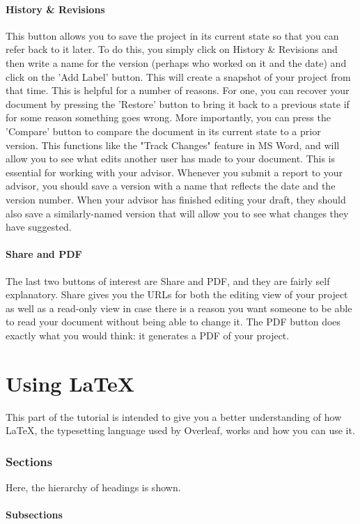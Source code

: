 \documentclass[english,12pt]{article}
\begin{document}
\subsection*{History \& Revisions}
This button allows you to save the project in its current state so that you can refer back to it later. To do this, you simply click on History \& Revisions and then write a name for the version (perhaps who worked on it and the date) and click on the 'Add Label' button. This will create a snapshot of your project from that time. This is helpful for a number of reasons. For one, you can recover your document by pressing the 'Restore' button to bring it back to a previous state if for some reason something goes wrong. More importantly, you can press the 'Compare' button to compare the document in its current state to a prior version. This functions like the "Track Changes" feature in MS Word, and will allow you to see what edits another user has made to your document. This is essential for working with your advisor. Whenever you submit a report to your advisor, you should save a version with a name that reflects the date and the version number. When your advisor has finished editing your draft, they should also save a similarly-named version that will allow you to see what changes they have suggested.

\subsection*{Share and PDF}
The last two buttons of interest are Share and PDF, and they are fairly self explanatory. Share gives you the URLs for both the editing view of your project as well as a read-only view in case there is a reason you want someone to be able to read your document without being able to change it. The PDF button does exactly what you would think: it generates a PDF of your project.

\part*{Using \LaTeX}
This part of the tutorial is intended to give you a better understanding of how \LaTeX, the typesetting language used by Overleaf, works and how you can use it.

\section{Sections}
Here, the hierarchy of headings is shown.
\subsection{Subsections}
\end{document}
